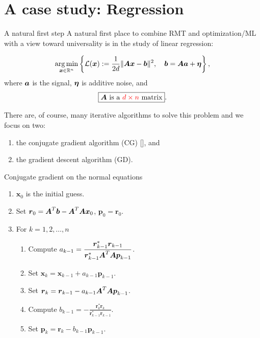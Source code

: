 \documentclass[9pt,aspectratio=169]{beamer}
\begin{document}
\section{A case study: Regression}

\begin{frame}{A natural first step}
 A natural first place to combine RMT and optimization/ML with a view toward universality is in the study of linear regression:
 
 \begin{align*}
     \underset{\xx \in \mathbb R^n}{\mathrm{arg}\, \mathrm{min}} \left\{ \mathcal L(\xx) : =\frac{1}{2d} \| \AA \xx - \bb\|^2, \quad \bb = \AA \aa + \eeta \right\},
 \end{align*}
 where $\aa$ is the signal, $\eeta$ is additive noise, and
 \begin{align*}
     \boxed{ \AA \text{ is a } \textcolor{red}{d \times n} \text{ matrix}}.
 \end{align*}

\pause

There are, of course, many iterative algorithms to solve this problem and we focus on two:
\begin{enumerate}
    \item the conjugate gradient algorithm (CG) [\cite{Hestenes1952}], and
    \item the gradient descent algorithm (GD). 
\end{enumerate}
 
\end{frame}

\begin{frame}{Conjugate gradient on the normal equations}
    \hspace{2in}
\begin{enumerate}
    \item $\boldsymbol x_0$ is the initial guess.
    \item Set $\boldsymbol r_0 = \AA^T\boldsymbol b - \AA^T\AA \boldsymbol x_0$, $\boldsymbol p_0= \boldsymbol r_0$.
    \item For $k = 1,2,\ldots,n$
    \begin{enumerate}
        \item Compute $\displaystyle a_{k-1} = \frac{\boldsymbol r_{k-1}^* \boldsymbol r_{k-1}}{\boldsymbol r_{k-1}^* \AA^T\AA \boldsymbol p_{k-1}}$.
        \item Set $\boldsymbol x_{k} = \boldsymbol x_{k-1} + a_{k-1} \boldsymbol p_{k-1}$.
        \item Set $\boldsymbol r_{k} = \boldsymbol r_{k-1} - a_{k-1} \AA^T\AA \boldsymbol p_{k-1}$.
        \item Compute $\displaystyle b_{k-1} = - \frac{\boldsymbol r_k^* \boldsymbol r_k}{\boldsymbol r_{k-1}^* \boldsymbol r_{k-1}}$.
        \item Set $\boldsymbol p_k =  \boldsymbol r_k - b_{k-1} \boldsymbol p_{k-1}$.
    \end{enumerate}
\end{enumerate}
\end{frame}
\end{document}
